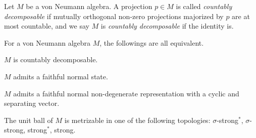 \documentclass{../../small}
\begin{document}
\begin{defn}
Let $M$ be a von Neumann algebra.
A projection $p\in M$ is called \emph{countably decomposable} if mutually orthogonal non-zero projections majorized by $p$ are at most countable, and we say $M$ is \emph{countably decomposable} if the identity is.
\end{defn}
\begin{prop}
For a von Neumann algebra $M$, the followings are all equivalent.
\begin{parts}
\item $M$ is countably decomposable.
\item $M$ admits a faithful normal state.
\item $M$ admits a faithful normal non-degenerate representation with a cyclic and separating vector.
\item The unit ball of $M$ is metrizable in one of the following topologies: $\sigma$-strong$^*$, $\sigma$-strong, strong$^*$, strong.
\end{parts}
\end{prop}
\end{document}
